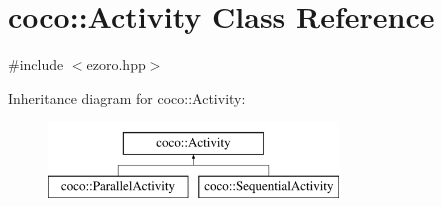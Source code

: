 \hypertarget{classcoco_1_1_activity}{\section{coco\-:\-:Activity Class Reference}
\label{classcoco_1_1_activity}
}


{\ttfamily \#include $<$ezoro.\-hpp$>$}

Inheritance diagram for coco\-:\-:Activity\-:\begin{figure}[H]
\begin{center}
\leavevmode
\includegraphics[height=2.000000cm]{classcoco_1_1_activity}
\end{center}
\end{figure}
